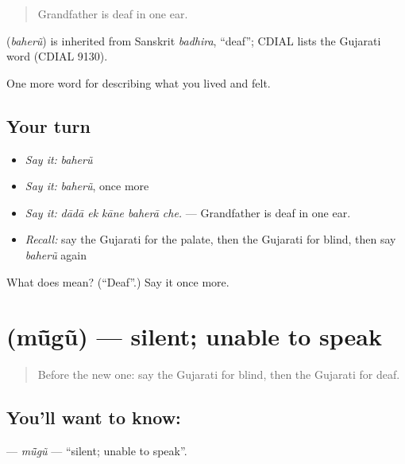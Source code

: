 \begin{quote}
Grandfather is deaf in one ear.
\end{quote}

\begin{cousinweb}
\textbf{} (\emph{baherũ}) is inherited from Sanskrit \emph{badhira}, \textquotedblleft{}deaf\textquotedblright{}; CDIAL lists the Gujarati word (CDIAL 9130).
\end{cousinweb}

\begin{grammarlens}[title={What you've built}]
One more word for describing what you lived and felt.
\end{grammarlens}

\subsection*{Your turn}
\begin{itemize}
\raggedright
  \item \emph{Say it:} \emph{baherũ}
  \item \emph{Say it:} \emph{baherũ}, once more
  \item \emph{Say it:} \emph{dādā ek kāne baherā che.} — Grandfather is deaf in one ear.
  \item \emph{Recall:} say the Gujarati for the palate, then the Gujarati for blind, then say \emph{baherũ} again
\end{itemize}

\begin{tcolorbox}[breakable,colback=teal!4,colframe=teal!35!black,title={Before you move on}]
What does  mean? (\textquotedblleft{}Deaf\textquotedblright{}.) Say it once more.
\end{tcolorbox}
\section[\texorpdfstring{\gu{મૂંગું} (mū̃gũ)}{મૂંગું (mū̃gũ)}]{ (mū̃gũ) — silent; unable to speak}

\label{lesson:GU-C475-mugu}



\begin{quote}
Before the new one: say the Gujarati for blind, then the Gujarati for deaf.
\end{quote}

\subsection*{You'll want to know: }
\textbf{} — \emph{mū̃gũ} — \textquotedblleft{}silent; unable to speak\textquotedblright{}.

